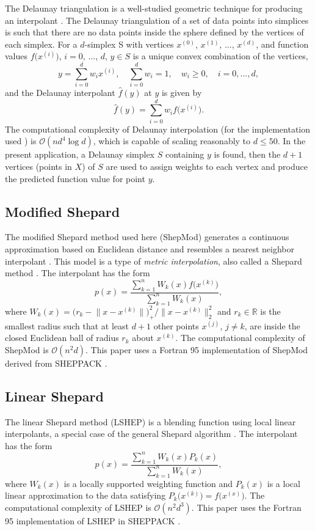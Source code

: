 \documentclass[smallextended,final]{svjour3}  %
\begin{document}
The Delaunay triangulation is a well-studied geometric technique for
producing an interpolant \cite{lee1980two}. The Delaunay triangulation
of a set of data points into simplices is such that there are no data
points inside the sphere defined by the vertices of each simplex. For
a $d$-simplex S with vertices $x^{(0)}$, $x^{(1)}$, $\ldots$,
$x^{(d)}$, and function values $f\bigl(x^{(i)}\bigr)$, $i=0$,
$\ldots$, $d$, $y \in S$ is a unique convex combination of the
vertices,
 $$ y = \sum_{i=0}^{d} w_i x^{(i)}, \quad \sum_{i=0}^{d} w_i = 1, \quad w_i \geq 0, \quad i=0,\ldots,d, $$
and the Delaunay interpolant $\hat f(y)$ at $y$ is given by
 $$ \hat f(y) = \sum_{i=0}^{d} w_i f\bigl(x^{(i)}\bigr). $$
The computational complexity of Delaunay interpolation (for the
implementation used \cite{chang2018polynomial}) is $\mathcal{O}(n d^4
\log d)$, which is capable of scaling reasonably to $d \leq 50$. In
the present application, a Delaunay simplex $S$ containing $y$ is
found, then the $d+1$ vertices (points in $X$) of $S$ are used to
assign weights to each vertex and produce the predicted function value
for point $y$.

\newpage

\subsection{Modified Shepard}
\label{sec:modified-shepard}

The modified Shepard method used here (ShepMod) generates a continuous
approximation based on Euclidean distance and resembles a nearest
neighbor interpolant \cite{cover1967nearest}. This model is a type of
\textit{metric interpolation}, also called a Shepard method
\cite{shepard1968two,gordon1978shepard}. The interpolant has the form
 $$ p(x) = \frac{\sum\limits_{k=1}^{n}W_k(x)f\bigl(x^{(k)}\bigr)}
     {\sum\limits_{k=1}^{n}W_k(x)} ,$$
where $W_k(x) = \bigl(r_k - \bigl\|x - x^{(k)}\bigr\|\bigr)_+^2 \big/
\bigl\|x - x^{(k)}\bigr\|_2^2$ and $r_k \in \mathbb{R}$ is the
smallest radius such that at least $d+1$ other points $x^{(j)}$, $j
\not = k$, are inside the closed Euclidean ball of radius $r_k$ about
$x^{(k)}$. The computational complexity of ShepMod is
$\mathcal{O}(n^2d)$. This paper uses a Fortran 95 implementation of
ShepMod derived from SHEPPACK \cite{thacker2010algorithm}.

\subsection{Linear Shepard}
The linear Shepard method (LSHEP) is a blending function using local
linear interpolants, a special case of the general Shepard algorithm
\cite{thacker2010algorithm}. The interpolant has the form
 $$ p(x) = \frac{\sum\limits_{k=1}^{n}W_k(x)P_k(x)}
 {\sum\limits_{k=1}^{n}W_k(x)} ,$$
where $W_k(x)$ is a locally supported weighting function and $P_k(x)$
is a local linear approximation to the data satisfying
$P_k\bigl(x^{(k)}\bigr) = f\bigl(x^{(x)}\bigr)$. The computational
complexity of LSHEP is $\mathcal{O}(n^2d^3)$. This paper uses the
Fortran 95 implementation of LSHEP in SHEPPACK
\cite{thacker2010algorithm}.
\end{document}
